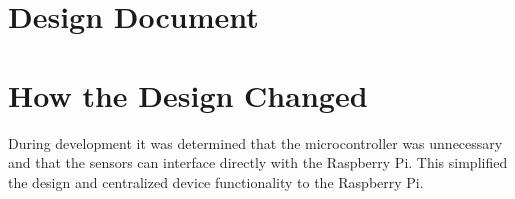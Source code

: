 \section{Design Document}


\section{How the Design Changed}

During development it was determined that the microcontroller was unnecessary and that the sensors can interface directly with the Raspberry Pi.
This simplified the design and centralized device functionality to the Raspberry Pi.


